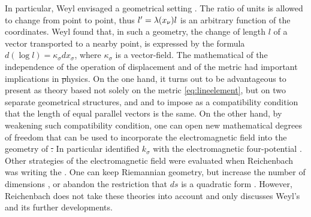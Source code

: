 \documentclass[submitted]{article}
\begin{document}
In particular, Weyl envisaged a geometrical setting  . The ratio of units is allowed to change from point to point, thus $l'=\lambda(x_{\nu})l$ is an arbitrary function of the coordinates. Weyl found that, in such a geometry, the change of length $l$ of a vector transported to a nearby point, is expressed by the formula $d (\log l)=\kappa_\sigma dx_\sigma$, where $\kappa_\sigma$ is a vector-field. The mathematical  of the independence of the operation of displacement and of the metric had important implications in \st physics. On the one hand, it turns out to be advantageous to present \gr as theory based not solely on the metric \cref{eq:lineelement}, but on two separate geometrical structures, and and to impose as  a compatibility condition that the length of equal parallel vectors is the same. On the other hand, by weakening such compatibility condition, one can open new mathematical degrees of freedom that can be used to incorporate the electromagnetic field into the geometry of \st. In particular \citet{Weyl1918a} identified $k_\sigma$ with the electromagnetic four-potential . Other strategies of  the electromagnetic field were evaluated when Reichenbach was writing the \Ap. One can keep Riemannian geometry, but increase the number of dimensions , or abandon the restriction that $ds$ is a quadratic form \citep{Reichenbaecher1925}. However, Reichenbach does not take these theories into account and only discusses Weyl's  and its further developments.
\end{document}
